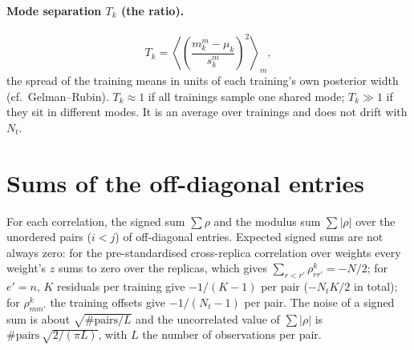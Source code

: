 \documentclass[11pt]{article}
\newcommand{\avg}[2]{\left\langle #1 \right\rangle_{#2}}
\begin{document}
\paragraph{Mode separation $T_k$ (the ratio).}\label{sec:ratio}
\begin{equation}
  T_k = \avg{\left(\frac{m_k^{m} - \mu_k}{s_k^{m}}\right)^2}{m},
\end{equation}
the spread of the training means in units of each training's own posterior width (cf.\ Gelman--Rubin).
$T_k \approx 1$ if all trainings sample one shared mode; $T_k \gg 1$ if they sit in different modes. It is an
average over trainings and does not drift with $N_t$.

\section{Sums of the off-diagonal entries}
For each correlation, the signed sum $\sum\rho$ and the modulus sum $\sum|\rho|$ over the unordered pairs
($i<j$) of off-diagonal entries. Expected signed sums are not always zero: for the pre-standardised
cross-replica correlation over weights every weight's $z$ sums to zero over the replicas, which gives
$\sum_{r<r'}\rho^{k}_{rr'} = -N/2$; for $e'=n$, $K$ residuals per training give $-1/(K-1)$ per pair
($-N_t K/2$ in total); for $\rho^{k}_{mm'}$ the training offsets give $-1/(N_t-1)$ per pair. The noise of a
signed sum is about $\sqrt{\#\text{pairs}/L}$ and the uncorrelated value of $\sum|\rho|$ is
$\#\text{pairs}\,\sqrt{2/(\pi L)}$, with $L$ the number of observations per pair. 
\end{document}
